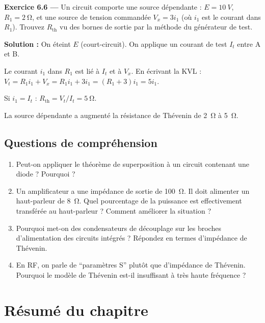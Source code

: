 \documentclass[12pt,a4paper,twoside]{book}
\begin{document}
\textbf{Exercice 6.6 ---} Un circuit comporte une source dépendante : $E = \SI{10}{V}$, $R_1 = \SI{2}{\ohm}$, et une source de tension commandée $V_x = 3i_1$ (où $i_1$ est le courant dans $R_1$). Trouvez $R_{\text{th}}$ vu des bornes de sortie par la méthode du générateur de test.

\begin{pratique}
\textbf{Solution :} On éteint $E$ (court-circuit). On applique un courant de test $I_t$ entre A et B.

Le courant $i_1$ dans $R_1$ est lié à $I_t$ et à $V_x$. En écrivant la KVL : $V_t = R_1 i_1 + V_x = R_1 i_1 + 3i_1 = (R_1 + 3)i_1 = 5i_1$.

Si $i_1 = I_t$ : $R_{\text{th}} = V_t / I_t = \SI{5}{\ohm}$.

La source dépendante a augmenté la résistance de Thévenin de \SI{2}{\ohm} à \SI{5}{\ohm}.
\end{pratique}

\subsection*{Questions de compréhension}

\begin{enumerate}[nosep]
\item Peut-on appliquer le théorème de superposition à un circuit contenant une diode ? Pourquoi ?
\item Un amplificateur a une impédance de sortie de \SI{100}{\ohm}. Il doit alimenter un haut-parleur de \SI{8}{\ohm}. Quel pourcentage de la puissance est effectivement transférée au haut-parleur ? Comment améliorer la situation ?
\item Pourquoi met-on des condensateurs de découplage sur les broches d'alimentation des circuits intégrés ? Répondez en termes d'impédance de Thévenin.
\item En RF, on parle de ``paramètres S'' plutôt que d'impédance de Thévenin. Pourquoi le modèle de Thévenin est-il insuffisant à très haute fréquence ?
\end{enumerate}

\section*{Résumé du chapitre}
\end{document}
